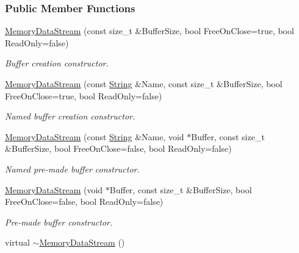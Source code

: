 \subsubsection*{Public Member Functions}
\begin{DoxyCompactItemize}
\item 
\hyperlink{classMezzanine_1_1Resource_1_1MemoryDataStream_a34a16a7e6be93233073c9af87fd26a00}{MemoryDataStream} (const size\_\-t \&BufferSize, bool FreeOnClose=true, bool ReadOnly=false)
\begin{DoxyCompactList}\small\item\em Buffer creation constructor. \item\end{DoxyCompactList}\item 
\hyperlink{classMezzanine_1_1Resource_1_1MemoryDataStream_a395645ef567a4d807bc835f4fa96206a}{MemoryDataStream} (const \hyperlink{namespaceMezzanine_acf9fcc130e6ebf08e3d8491aebcf1c86}{String} \&Name, const size\_\-t \&BufferSize, bool FreeOnClose=true, bool ReadOnly=false)
\begin{DoxyCompactList}\small\item\em Named buffer creation constructor. \item\end{DoxyCompactList}\item 
\hyperlink{classMezzanine_1_1Resource_1_1MemoryDataStream_a55987263974a0ceeceeda7ddcc52ed1d}{MemoryDataStream} (const \hyperlink{namespaceMezzanine_acf9fcc130e6ebf08e3d8491aebcf1c86}{String} \&Name, void $\ast$Buffer, const size\_\-t \&BufferSize, bool FreeOnClose=false, bool ReadOnly=false)
\begin{DoxyCompactList}\small\item\em Named pre-\/made buffer constructor. \item\end{DoxyCompactList}\item 
\hyperlink{classMezzanine_1_1Resource_1_1MemoryDataStream_a018900010dcbc7ebca89ec6c00157fd6}{MemoryDataStream} (void $\ast$Buffer, const size\_\-t \&BufferSize, bool FreeOnClose=false, bool ReadOnly=false)
\begin{DoxyCompactList}\small\item\em Pre-\/made buffer constructor. \item\end{DoxyCompactList}\item 
\hypertarget{classMezzanine_1_1Resource_1_1MemoryDataStream_aadcb282b8e6c80f12331c388c001fb49}{
virtual \hyperlink{classMezzanine_1_1Resource_1_1MemoryDataStream_aadcb282b8e6c80f12331c388c001fb49}{$\sim$MemoryDataStream} ()}
\label{classMezzanine_1_1Resource_1_1MemoryDataStream_aadcb282b8e6c80f12331c388c001fb49}


\end{DoxyCompactItemize}
